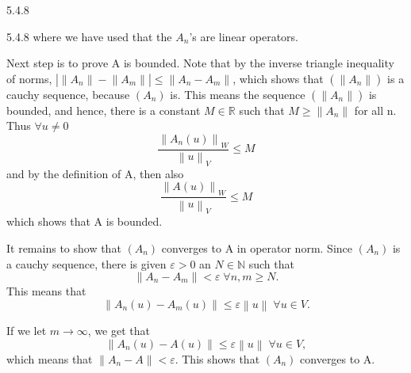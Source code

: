 \documentclass[a4paper,norsk]{article}
\renewcommand{\geq}{\geqslant}
\renewcommand{\leq}{\leqslant}
\renewcommand{\epsilon}{\varepsilon}
\begin{document}
\begin{theorembox}{5.4.8}{}
\begin{proofbox}{5.4.8}{}
    where we have used that the $ A_n $'s are linear operators.
    
    
    Next step is to prove A is bounded. Note that by the inverse triangle inequality of norms, $ \left| \left\lVert A_n \right\rVert - \left\lVert A_m \right\rVert  \right| \leq  \left\lVert A_n - A_m \right\rVert  $, which shows that $ \left( \left\lVert A_n \right\rVert  \right)  $ is a cauchy sequence, because $ \left( A_n \right)  $ is. This means the sequence $ \left( \left\lVert A_n \right\rVert  \right)  $ is bounded, and hence, there is a constant $ M \in \mathbb{R} $  such that $ M \geq \left\lVert A_n \right\rVert  $ for all n. Thus $ \forall u \neq 0 $  
    \[
        \frac{ \left\lVert A_n \left( u \right)  \right\rVert_W  }{ \left\lVert u \right\rVert_V  } \leq M
    \]
    and by the definition of A, then also
    \[
        \frac{ \left\lVert A \left( u \right) \right\rVert_W  }{ \left\lVert u \right\rVert _V } \leq M
    \]
    which shows that A is bounded. 


    It remains to show that $ \left( A_n \right)  $ converges to A in operator norm. Since $ \left( A_n \right)  $ is a cauchy sequence, there is given $ \epsilon > 0 $ an $ N \in \mathbb{N} $ such that 
    \[
        \left\lVert A_n - A_m \right\rVert < \epsilon \; \forall n, m \geq N.
    \]
    This means that 
    \[
        \left\lVert A_n \left( u \right) - A_m \left( u \right)  \right\rVert \leq \epsilon \left\lVert u \right\rVert \; \forall u \in V.
    \]
    
    If we let $ m \to \infty $, we get that 
    \[
        \left\lVert A_n \left( u \right) - A \left( u \right)  \right\rVert \leq \epsilon \left\lVert u \right\rVert  \; \forall u \in V,
    \]
     which means that $ \left\lVert A_n - A \right\rVert < \epsilon  $. This shows that $ \left( A_n \right)  $ converges to A.
\end{proofbox}
\end{theorembox}
\end{document}
